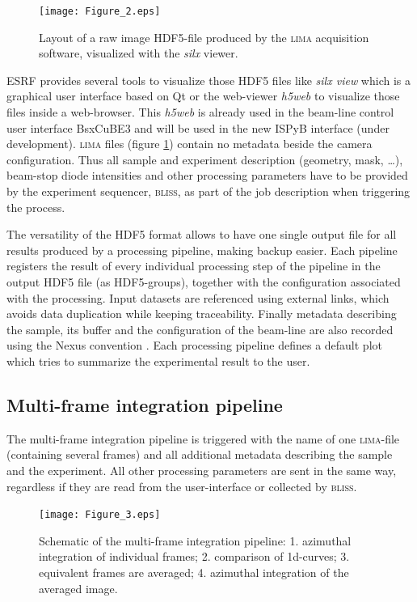 \documentclass[preprint]{iucr}              %
\begin{document}
\begin{figure}
     \caption{Layout of a raw image HDF5-file produced by the \textsc{lima} acquisition software, visualized with the \textit{silx} viewer.}
     \texttt{[image: Figure\_2.eps]}
     \label{lima}
\end{figure}

ESRF provides several tools to visualize those HDF5 files like \textit{silx view} \cite{silx} which is a graphical user interface based on Qt \cite{pyqt} or the web-viewer \textit{h5web} \cite{h5web} to visualize those files inside a web-browser.
This \textit{h5web} is already used in the beam-line control user interface BsxCuBE3 \cite{bm29_2022} and will be used in the new ISPyB interface (under development).
\textsc{lima} files (figure \ref{lima}) contain no metadata beside the camera configuration.
Thus all sample and experiment description (geometry, mask, \ldots), beam-stop diode intensities and other processing parameters have to be provided by the experiment sequencer, \textsc{bliss}, as part of the job description when triggering the process.

The versatility of the HDF5 format allows to have one single output file for all results produced by a processing pipeline, making backup easier.
Each pipeline registers the result of every individual processing step of the pipeline in the output HDF5 file (as HDF5-groups), together with the configuration associated with the processing.
Input datasets are referenced using external links, which avoids data duplication while keeping traceability. 
Finally metadata describing the sample, its buffer and the configuration of the beam-line are also recorded using the Nexus convention \cite{nexus}.
Each processing pipeline defines a default plot which tries to summarize the experimental result to the user.

\subsection{Multi-frame integration pipeline}
\label{multiframe_pipeline}
The multi-frame integration pipeline is triggered with the name of one \textsc{lima}-file (containing several frames) and all additional metadata describing the sample and the experiment.
All other processing parameters are sent in the same way, regardless if they are read from the user-interface or collected by \textsc{bliss}.

\begin{figure}
     \label{multiframe_worflow}
     \begin{center} 
     \caption{Schematic of the multi-frame integration pipeline: 
     1. azimuthal integration of individual frames; 
     2. comparison of 1d-curves;
     3. equivalent frames are averaged;
     4. azimuthal integration of the averaged image.}
     \texttt{[image: Figure\_3.eps]}
     \end{center}
\end{figure}
\end{document}
